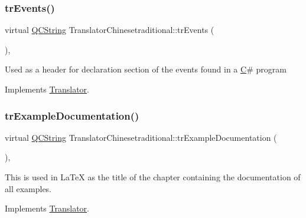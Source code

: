 \mbox{\label{class_translator_chinesetraditional_ad83304224ff49e184e4e14624f8ec300}} 
\subsubsection{\texorpdfstring{trEvents()}{trEvents()}}
{\footnotesize\ttfamily virtual \mbox{\hyperlink{class_q_c_string}{Q\+C\+String}} Translator\+Chinesetraditional\+::tr\+Events (\begin{DoxyParamCaption}{ }\end{DoxyParamCaption})\hspace{0.3cm}{\ttfamily [inline]}, {\ttfamily [virtual]}}

Used as a header for declaration section of the events found in a \mbox{\hyperlink{class_c}{C}}\# program 

Implements \mbox{\hyperlink{class_translator}{Translator}}.

\mbox{\label{class_translator_chinesetraditional_a9854b2d04ca29b03620b861fa4e68a47}} 
\subsubsection{\texorpdfstring{trExampleDocumentation()}{trExampleDocumentation()}}
{\footnotesize\ttfamily virtual \mbox{\hyperlink{class_q_c_string}{Q\+C\+String}} Translator\+Chinesetraditional\+::tr\+Example\+Documentation (\begin{DoxyParamCaption}{ }\end{DoxyParamCaption})\hspace{0.3cm}{\ttfamily [inline]}, {\ttfamily [virtual]}}

This is used in La\+TeX as the title of the chapter containing the documentation of all examples. 

Implements \mbox{\hyperlink{class_translator}{Translator}}.

\mbox{\label{class_translator_chinesetraditional_a538d7aac5d4193d83cf4495b9138ba8e}} 
